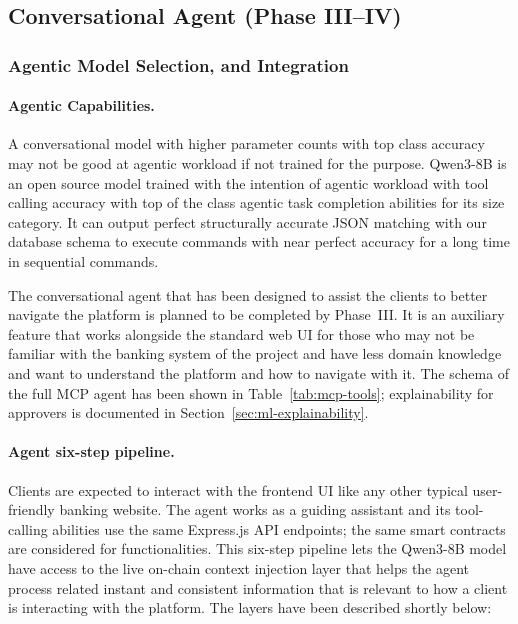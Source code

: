 \subsection{Conversational Agent (Phase III--IV)}
\label{sec:optional-agent}

\subsubsection{Agentic Model Selection, and Integration}

\paragraph{Agentic Capabilities.} A conversational model with higher parameter counts with top class accuracy may not be good at agentic workload if not trained for the purpose. Qwen3-8B is an open source model trained with the intention of agentic workload with tool calling accuracy with top of the class agentic task completion abilities for its size category. It can output perfect structurally accurate JSON matching with our database schema to execute commands with near perfect accuracy for a long time in sequential commands.

The conversational agent that has been designed to assist the clients to better navigate the platform is planned to be completed by Phase~III. It is an auxiliary feature that works alongside the standard web UI for those who may not be familiar with the banking system of the project and have less domain knowledge and want to understand the platform and how to navigate with it. The schema of the full MCP agent has been shown in Table~\ref{tab:mcp-tools}; explainability for approvers is documented in Section~\ref{sec:ml-explainability}.

\paragraph{Agent six-step pipeline.} Clients are expected to interact with the frontend UI like any other typical user-friendly banking website. The agent works as a guiding assistant and its tool-calling abilities use the same Express.js API endpoints; the same smart contracts are considered for functionalities. This six-step pipeline lets the Qwen3-8B model have access to the live on-chain context injection layer that helps the agent process related instant and consistent information that is relevant to how a client is interacting with the platform. The layers have been described shortly below:


